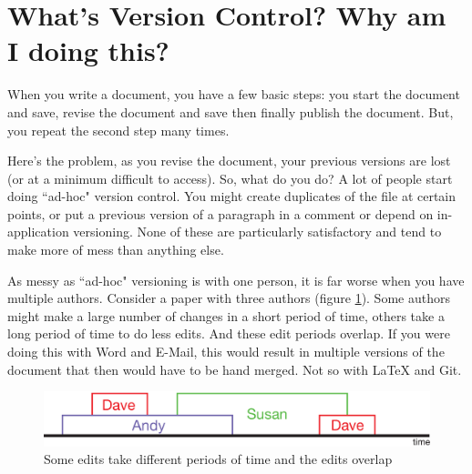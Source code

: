 \section*{What's Version Control? Why am I doing this?}

When you write a document, you have a few basic steps: you start the document and save, revise the document and save then finally publish the document.  But, you repeat the second step many times.

Here's the problem, as you revise the document, your previous versions are lost (or at a minimum difficult to access).  So, what do you do?  A lot of people start doing ``ad-hoc" version control.  You might create duplicates of the file at certain points, or put a previous version of a paragraph in a comment or depend on in-application versioning.  None of these are particularly satisfactory and tend to make more of mess than anything else.

As messy as ``ad-hoc" versioning is with one person, it is far worse when you have multiple authors.  Consider a paper with three authors (figure \ref{fig:timeline}).  Some authors might make a large number of changes in a short period of time, others take a long period of time to do less edits.  And these edit periods overlap.  If you were doing this with Word and E-Mail, this would result in multiple versions of the document that then would have to be hand merged. Not so with LaTeX and Git.

\begin{figure}[hbt]
	\centering
  	\includegraphics[width=6in]{graphics/timeline.eps}
  	\caption{Some edits take different periods of time and the edits overlap}
  	\label{fig:timeline}
\end{figure}